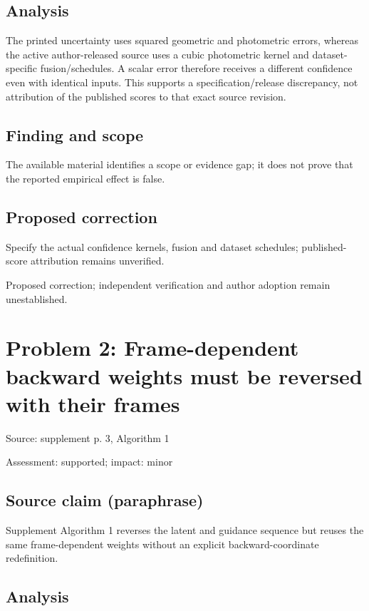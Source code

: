 \documentclass[11pt]{article}
\begin{document}
\subsection*{Analysis}

The printed uncertainty uses squared geometric and photometric errors, whereas the active author-released source uses a cubic photometric kernel and dataset-specific fusion/schedules. A scalar error therefore receives a different confidence even with identical inputs. This supports a specification/release discrepancy, not attribution of the published scores to that exact source revision.

\subsection*{Finding and scope}

The available material identifies a scope or evidence gap; it does not prove that the reported empirical effect is false.

\subsection*{Proposed correction}

Specify the actual confidence kernels, fusion and dataset schedules; published-score attribution remains unverified.

Proposed correction; independent verification and author adoption remain unestablished.

\section*{Problem 2: Frame-dependent backward weights must be reversed with their frames}

Source: supplement p. 3, Algorithm 1

Assessment: supported; impact: minor

\subsection*{Source claim (paraphrase)}

Supplement Algorithm 1 reverses the latent and guidance sequence but reuses the same frame-dependent weights without an explicit backward-coordinate redefinition.

\subsection*{Analysis}
\end{document}

